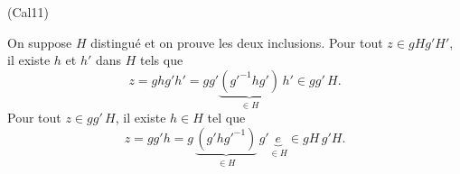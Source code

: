 \begin{tiny}(Cal11)\end{tiny} On suppose $H$ distingué et on prouve les deux inclusions.\newline
Pour tout $z\in gHg'H'$, il existe $h$ et $h'$ dans $H$ tels que
\[
 z = ghg'h' = gg' \underset{\in H}{\underbrace{(g'^{-1}hg')}}\, h' \in gg'\,H.
\]
Pour tout $z\in gg'\,H$, il existe $h\in H$ tel que
\[
 z = gg'h = g \,\underset{\in H}{\underbrace{(g'hg'^{-1})}}\,g' \underset{\in H}{\underbrace{e}} \in gH\, g'H.
\]
